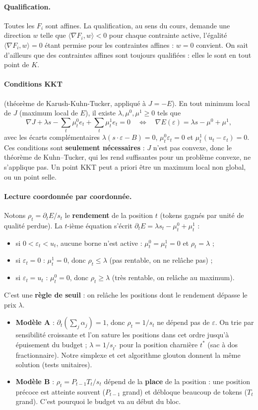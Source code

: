 \documentclass[11pt,a4paper]{article}
\newcommand{\sca}[2]{\langle #1,#2\rangle}
\theoremstyle{plain}
\theoremstyle{definition}
\begin{document}
\paragraph{Qualification.} Toutes les $F_i$ sont affines. La qualification, au sens du cours, demande une direction $w$ telle que $\sca{\nabla F_i}{w}<0$ pour chaque contrainte active, l'égalité $\sca{\nabla F_i}{w}=0$ étant permise pour les contraintes affines : $w=0$ convient. On sait d'ailleurs que des contraintes affines sont toujours qualifiées : elles le sont en tout point de $K$.

\paragraph{Conditions KKT} (théorème de Karush-Kuhn-Tucker, appliqué à $J=-E$). En tout minimum local de $J$ (maximum local de $E$), il existe $\lambda,\mu^0,\mu^1\ge0$ tels que
\[\nabla J+\lambda s-\sum_t\mu^0_te_t+\sum_t\mu^1_te_t=0\quad\Longleftrightarrow\quad \nabla E(\varepsilon)=\lambda s-\mu^0+\mu^1,\]
avec les écarts complémentaires $\lambda(s\cdot\varepsilon-B)=0$, $\mu^0_t\varepsilon_t=0$ et $\mu^1_t(u_t-\varepsilon_t)=0$.
Ces conditions sont \textbf{seulement nécessaires} : $J$ n'est pas convexe, donc le théorème de Kuhn--Tucker, qui les rend suffisantes pour un problème convexe, ne s'applique pas. Un point KKT peut a priori être un maximum local non global, ou un point selle.

\paragraph{Lecture coordonnée par coordonnée.} Notons $\rho_t=\partial_tE/s_t$ le \textbf{rendement} de la position $t$ (tokens gagnés par unité de qualité perdue). La $t$-ième équation s'écrit $\partial_tE=\lambda s_t-\mu^0_t+\mu^1_t$ :
\begin{itemize}
\item si $0<\varepsilon_t<u_t$, aucune borne n'est active : $\mu^0_t=\mu^1_t=0$ et $\rho_t=\lambda$ ;
\item si $\varepsilon_t=0$ : $\mu^1_t=0$, donc $\rho_t\le\lambda$ (pas rentable, on ne relâche pas) ;
\item si $\varepsilon_t=u_t$ : $\mu^0_t=0$, donc $\rho_t\ge\lambda$ (très rentable, on relâche au maximum).
\end{itemize}
C'est une \textbf{règle de seuil} : on relâche les positions dont le rendement dépasse le prix $\lambda$.
\begin{itemize}
\item \textbf{Modèle A} : $\partial_t(\sum_j\alpha_j)=1$, donc $\rho_t=1/s_t$ ne dépend pas de $\varepsilon$. On trie par sensibilité croissante et l'on sature les positions dans cet ordre jusqu'à épuisement du budget ; $\lambda=1/s_{t^*}$ pour la position charnière $t^*$ (sac à dos fractionnaire). Notre simplexe et cet algorithme glouton donnent la même solution (tests unitaires).
\item \textbf{Modèle B} : $\rho_t=P_{t-1}T_t/s_t$ dépend de la \textbf{place} de la position : une position précoce est atteinte souvent ($P_{t-1}$ grand) et débloque beaucoup de tokens ($T_t$ grand). C'est pourquoi le budget va au début du bloc.
\end{itemize}
\end{document}
